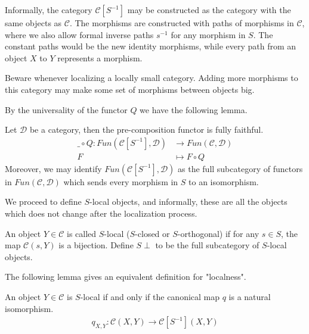 \documentclass[../../../thesis.tex]{subfiles}
\begin{document}
            Informally, the category $\mathcal{C}[S^{-1}]$ may be constructed as the category with the same objects as $\mathcal{C}$. The morphisms are constructed with paths of morphisms in $\mathcal{C}$, where we also allow formal inverse paths $s^{-1}$ for any morphism in $S$. The constant paths would be the new identity morphisms, while every path from an object $X$ to $Y$ represents a morphism.

            \begin{remark}
                Beware whenever localizing a locally small category. Adding more morphisms to this category may make some set of morphisms between objects big.
            \end{remark}

            By the universality of the functor $Q$ we have the following lemma.

            \begin{lemma}
                Let $\mathcal{D}$ be a category, then the pre-composition functor is fully faithful.
                \begin{align*}
                    \_ \circ Q : Fun(\mathcal{C}[S^{-1}],\mathcal{D}) & \rightarrow Fun(\mathcal{C}, \mathcal{D}) \\
                    F & \mapsto F \circ Q
                \end{align*}
                Moreover, we may identify $Fun(\mathcal{C}[S^{-1}],\mathcal{D})$ as the full subcategory of functors in $Fun(\mathcal{C}, \mathcal{D})$ which sends every morphism in $S$ to an isomorphism.
            \end{lemma}

            We proceed to define $S$-local objects, and informally, these are all the objects which does not change after the localization process.

            \begin{definition}
                An object $Y\in \mathcal{C}$ is called $S$-local ($S$-closed or $S$-orthogonal) if for any $s\in S$, the map $\mathcal{C}(s, Y)$ is a bijection. Define $S\perp$ to be the full subcategory of $S$-local objects.
            \end{definition}

            The following lemma gives an equivalent definition for "localness".

            \begin{lemma}
                An object $Y\in \mathcal{C}$ is $S$-local if and only if the canonical map $q$ is a natural isomorphism.
                \begin{align*}
                    q_{X,Y} : \mathcal{C}(X,Y) \rightarrow \mathcal{C}[S^{-1}](X,Y)
                \end{align*}
            \end{lemma}
\end{document}
